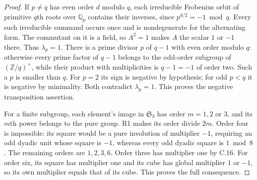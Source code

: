 \begin{proof}
If $p\ne q$ has even order $d$ modulo $q$,
each irreducible Frobenius orbit of primitive
$q$th roots over $\mathbb Q_p$ contains their
inverses, since $p^{d/2}=-1\bmod q$.
Every such irreducible summand occurs once and
is nondegenerate for the alternating form.
The commutant on it is a field, so $A^2=1$
makes $A$ the scalar $1$ or $-1$ there.
Thus $\lambda_p=1$.
There is a prime divisor $p$ of $q-1$ with
even order modulo $q$: otherwise every prime
factor of $q-1$ belongs to the odd-order
subgroup of $(\mathbb Z/q)^\times$, while their
product with multiplicities is $q-1=-1$ of
order two.  Such a $p$ is smaller than $q$.
For $p=2$ its sign is negative by hypothesis;
for odd $p<q$ it is negative by minimality.
Both contradict $\lambda_p=1$.  This proves
the negative transposition assertion.

For a finite subgroup, each element's image
in $\mathfrak S_3$ has order $m=1,2$ or $3$,
and its $m$th power belongs to the pure group.
R1 makes its order divide $2m$.  Order four
is impossible: its square would be a pure
involution of multiplier $-1$, requiring an
odd dyadic unit whose square is $-1$, whereas
every odd dyadic square is $1\bmod8$.
The remaining orders are $1,2,3,6$.
Order three has multiplier one by C.16.
For order six, its square has multiplier one
and its cube has global multiplier $1$ or
$-1$, so its own multiplier equals that of
its cube.  This proves the full consequence.
\end{proof}

